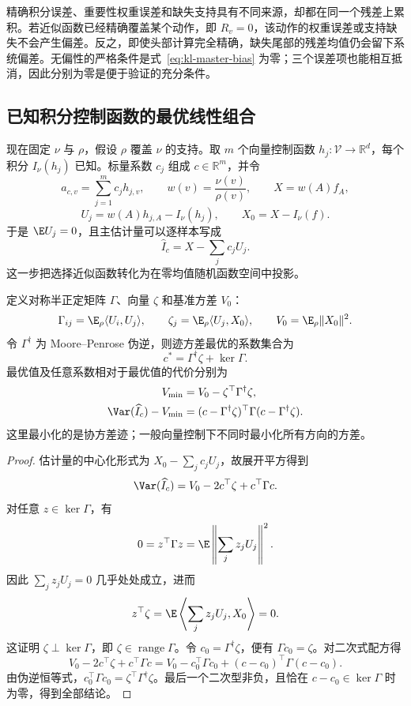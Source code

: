 精确积分误差、重要性权重误差和缺失支持具有不同来源，却都在同一个残差上累积。若近似函数已经精确覆盖某个动作，即 $R_v=0$，该动作的权重误差或支持缺失不会产生偏差。反之，即使头部计算完全精确，缺失尾部的残差均值仍会留下系统偏差。无偏性的严格条件是式~\eqref{eq:kl-master-bias} 为零；三个误差项也能相互抵消，因此分别为零是便于验证的充分条件。

\subsection{已知积分控制函数的最优线性组合}

现在固定 $\nu$ 与 $\rho$，假设 $\rho$ 覆盖 $\nu$ 的支持。取 $m$ 个向量控制函数 $h_j:\mathcal V\to\mathbb R^d$，每个积分 $I_\nu(h_j)$ 已知。标量系数 $c_j$ 组成 $c\in\mathbb R^m$，并令
\[
 a_{c,v}=\sum_{j=1}^m c_jh_{j,v},\qquad
 w(v)=\frac{\nu(v)}{\rho(v)},\qquad X=w(A)f_A,
\]
\[
 U_j=w(A)h_{j,A}-I_\nu(h_j),\qquad
 X_0=X-I_\nu(f).
\]
于是 $\E U_j=0$，且主估计量可以逐样本写成
\[
 \widehat I_c=X-\sum_jc_jU_j.
\]
这一步把选择近似函数转化为在零均值随机函数空间中投影。

\begin{theorem}
\label{thm:kl-master-gram}
定义对称半正定矩阵 $\Gamma$、向量 $\zeta$ 和基准方差 $V_0$：
\[
 \Gamma_{ij}=\E_\rho\langle U_i,U_j\rangle,\qquad
 \zeta_j=\E_\rho\langle U_j,X_0\rangle,\qquad
 V_0=\E_\rho\lVert X_0\rVert^2.
\]
令 $\Gamma^\dagger$ 为 Moore--Penrose 伪逆，则迹方差最优的系数集合为
\[
 c^*=\Gamma^\dagger\zeta+\ker\Gamma.
\]
最优值及任意系数相对于最优值的代价分别为
\begin{align}
 V_{\min}&=V_0-\zeta^\top\Gamma^\dagger\zeta,\\
 \Var(\widehat I_c)-V_{\min}
 &=(c-\Gamma^\dagger\zeta)^\top\Gamma(c-\Gamma^\dagger\zeta).
 \label{eq:kl-master-gram-regret}
\end{align}
这里最小化的是协方差迹；一般向量控制下不同时最小化所有方向的方差。
\end{theorem}

\begin{proof}
估计量的中心化形式为 $X_0-\sum_jc_jU_j$，故展开平方得到
\[
 \Var(\widehat I_c)=V_0-2c^\top\zeta+c^\top\Gamma c.
\]
对任意 $z\in\ker\Gamma$，有
\[
 0=z^\top\Gamma z=\E\left\lVert\sum_jz_jU_j\right\rVert^2.
\]
因此 $\sum_jz_jU_j=0$ 几乎处处成立，进而
\[
 z^\top\zeta=\E\left\langle\sum_jz_jU_j,X_0\right\rangle=0.
\]
这证明 $\zeta\perp\ker\Gamma$，即 $\zeta\in\operatorname{range}\Gamma$。令 $c_0=\Gamma^\dagger\zeta$，便有 $\Gamma c_0=\zeta$。对二次式配方得
\[
 V_0-2c^\top\zeta+c^\top\Gamma c
 =V_0-c_0^\top\Gamma c_0+(c-c_0)^\top\Gamma(c-c_0).
\]
由伪逆恒等式，$c_0^\top\Gamma c_0=\zeta^\top\Gamma^\dagger\zeta$。最后一个二次型非负，且恰在 $c-c_0\in\ker\Gamma$ 时为零，得到全部结论。
\end{proof}

